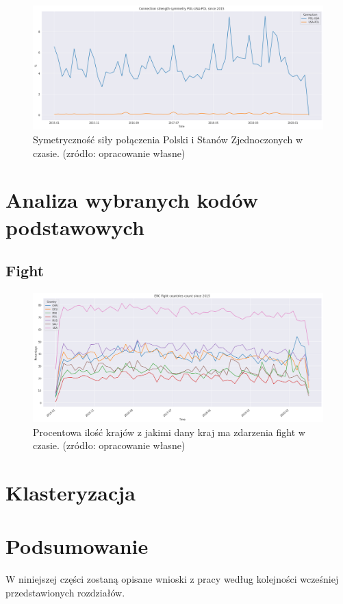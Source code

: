 \documentclass[11pt]{report}
\begin{document}
    \begin{figure}[ht]
	\centering
	\includegraphics[width=0.8 \textwidth]{fig/ConnectionSymmetry/POL-USA-POL.png}
	\caption{Symetryczność siły połączenia Polski i Stanów Zjednoczonych w czasie. (zródło: opracowanie własne)}
	\label{fig:POL-USA-POL}
	\end{figure}

 \chapter{Analiza wybranych kodów podstawowych}
 \section{Fight}
 
     \begin{figure}[ht]
	\centering
	\includegraphics[width=0.8 \textwidth]{fig/ERC/Fight.png}
	\caption{Procentowa ilość krajów z jakimi dany kraj ma zdarzenia fight w czasie. (zródło: opracowanie własne)}
	\label{fig:Fight}
	\end{figure}
 
 \chapter{Klasteryzacja} 
 
 \chapter{Podsumowanie}
W niniejszej części zostaną opisane wnioski z pracy według kolejności wcześniej przedstawionych rozdziałów.
\end{document}
